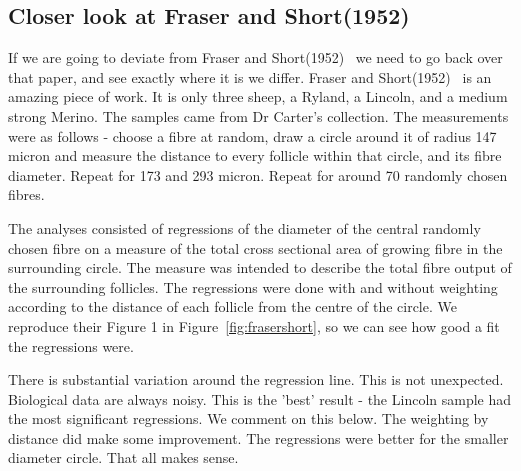 \documentclass[titlepage]{article}  %
\begin{document}
\subsection{Closer look at Fraser and Short(1952)~\cite{fras:52}}
If we are going to deviate from Fraser and Short(1952)~\cite{fras:52} we need to go back over that paper, and see exactly where it is we differ. Fraser and Short(1952)~\cite{fras:52} is an amazing piece of work. It is only three sheep, a Ryland, a Lincoln, and a medium strong Merino. The samples came from Dr Carter's collection. The measurements were as follows - choose a fibre at random, draw a circle around it of radius 147 micron and measure the distance to every follicle within that circle, and its fibre diameter. Repeat for 173 and 293 micron. Repeat for around 70 randomly chosen fibres.

The analyses consisted of regressions of the diameter of the central randomly chosen fibre on a measure of the total cross sectional area of growing fibre in the surrounding circle. The measure was intended to describe the total fibre output of the surrounding follicles.  The regressions were done with and without weighting according to the distance of each follicle from the centre of the circle. We reproduce their Figure 1  in Figure~\ref{fig:frasershort}, so we can see how good a fit the regressions were.

There is substantial variation around the regression line. This is not unexpected. Biological data are always noisy. This is the 'best' result - the Lincoln sample had the most significant regressions. We comment on this below. The weighting by distance did make some improvement.  The regressions were better for the smaller diameter circle. That all makes sense.
\end{document}
